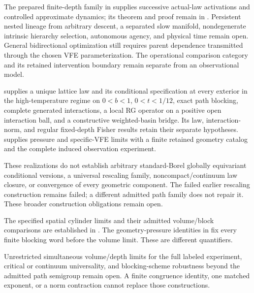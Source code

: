 \begin{description}
The prepared finite-depth family in
 supplies successive actual-law
activations and controlled approximate dynamics; its theorem and proof
remain in .
Persistent nested lineage from arbitrary descent, a separated slow
manifold, nondegenerate intrinsic hierarchy selection, autonomous agency,
and physical time remain open. General bidirectional optimization still
requires parent dependence transmitted through the chosen VFE
parameterization. The operational comparison category and its retained
intervention boundary remain separate from an observational model.

\item[Constructive lattice RG (established/open split).]
 supplies a unique lattice law and its
conditional specification at every exterior in the high-temperature regime on $0<b<1$, $0<t<1/12$, exact path blocking,
complete generated interactions, a local RG operator on a positive open
interaction ball, and a constructive weighted-basin bridge. Its law,
interaction-norm, and regular fixed-depth Fisher results retain their
separate hypotheses.  supplies pressure and
specific-VFE limits with a finite retained geometry catalog and the
complete induced observation experiment. 

These realizations do not establish arbitrary standard-Borel globally
equivariant conditional versions, a universal rescaling family,
noncompact/continuum law closure, or convergence of every geometric
component. The failed earlier rescaling construction remains failed;
a different admitted path family does not repair it. These broader
construction obligations remain open. 

\item[Two-index limits and universality (established/open split).]
The specified spatial cylinder limits and their admitted volume/block
comparisons are established in .
The geometry-pressure identities in  fix every
finite blocking word before the volume limit. These are different
quantifiers. 

Unrestricted simultaneous volume/depth limits for the full labeled
experiment, critical or continuum universality, and blocking-scheme
robustness beyond the admitted path semigroup remain open. A finite
congruence identity, one matched exponent, or a norm contraction cannot
replace those constructions. 


\end{description}
